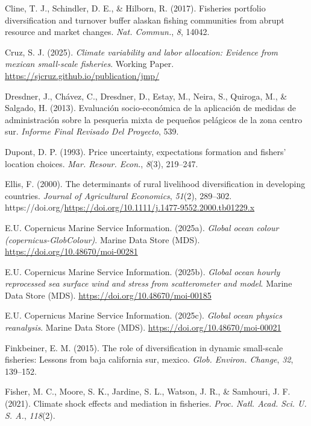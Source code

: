\documentclass[
  11pt,
]{article}
\newlength{\cslhangindent}
\newenvironment{CSLReferences}[2] %
 {\begin{list}{}{%
  \setlength{\itemindent}{0pt}
  \setlength{\leftmargin}{0pt}
  \setlength{\parsep}{0pt}
  \ifodd #1
   \setlength{\leftmargin}{\cslhangindent}
   \setlength{\itemindent}{-1\cslhangindent}
  \fi
  \setlength{\itemsep}{#2\baselineskip}}}
 {\end{list}}
\begin{document}
\begin{CSLReferences}{1}{0}
Cline, T. J., Schindler, D. E., \& Hilborn, R. (2017). Fisheries portfolio diversification and turnover buffer alaskan fishing communities from abrupt resource and market changes. \emph{Nat. Commun.}, \emph{8}, 14042.

Cruz, S. J. (2025). \emph{Climate variability and labor allocation: Evidence from mexican small-scale fisheries}. Working Paper. \url{https://sjcruz.github.io/publication/jmp/}

Dresdner, J., Chávez, C., Dresdner, D., Estay, M., Neira, S., Quiroga, M., \& Salgado, H. (2013). Evaluaci{ó}n socio-econ{ó}mica de la aplicaci{ó}n de medidas de administraci{ó}n sobre la pesquer{ı́}a mixta de peque{ñ}os pel{á}gicos de la zona centro sur. \emph{Informe Final Revisado Del Proyecto}, 539.

Dupont, D. P. (1993). Price uncertainty, expectations formation and fishers' location choices. \emph{Mar. Resour. Econ.}, \emph{8}(3), 219--247.

Ellis, F. (2000). The determinants of rural livelihood diversification in developing countries. \emph{Journal of Agricultural Economics}, \emph{51}(2), 289--302. https://doi.org/\url{https://doi.org/10.1111/j.1477-9552.2000.tb01229.x}

E.U. Copernicus Marine Service Information. (2025a). \emph{Global ocean colour (copernicus-GlobColour)}. Marine Data Store (MDS). \url{https://doi.org/10.48670/moi-00281}

E.U. Copernicus Marine Service Information. (2025b). \emph{Global ocean hourly reprocessed sea surface wind and stress from scatterometer and model}. Marine Data Store (MDS). \url{https://doi.org/10.48670/moi-00185}

E.U. Copernicus Marine Service Information. (2025c). \emph{Global ocean physics reanalysis}. Marine Data Store (MDS). \url{https://doi.org/10.48670/moi-00021}

Finkbeiner, E. M. (2015). The role of diversification in dynamic small-scale fisheries: Lessons from baja california sur, mexico. \emph{Glob. Environ. Change}, \emph{32}, 139--152.

Fisher, M. C., Moore, S. K., Jardine, S. L., Watson, J. R., \& Samhouri, J. F. (2021). Climate shock effects and mediation in fisheries. \emph{Proc. Natl. Acad. Sci. U. S. A.}, \emph{118}(2).


\end{CSLReferences}
\end{document}
